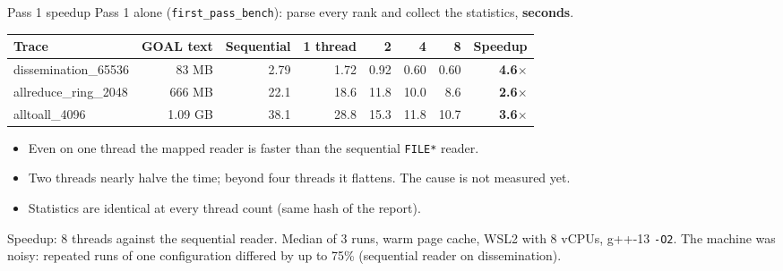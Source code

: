\documentclass[aspectratio=169,11pt]{beamer}
\begin{document}
\begin{frame}{Pass 1 speedup}
\small
Pass 1 alone (\texttt{first\_pass\_bench}): parse every rank and collect the statistics, \textbf{seconds}.
\vspace{2mm}

\centering
\footnotesize
\begin{tabular}{lrrrrrrr}
\toprule
\textbf{Trace} & \textbf{GOAL text} & \textbf{Sequential} & \textbf{1 thread} & \textbf{2} & \textbf{4} & \textbf{8} & \textbf{Speedup} \\
\midrule
dissemination\_65536 & 83 MB & 2.79 & 1.72 & 0.92 & 0.60 & 0.60 & \textbf{4.6$\times$} \\
allreduce\_ring\_2048 & 666 MB & 22.1 & 18.6 & 11.8 & 10.0 & 8.6 & \textbf{2.6$\times$} \\
alltoall\_4096 & 1.09 GB & 38.1 & 28.8 & 15.3 & 11.8 & 10.7 & \textbf{3.6$\times$} \\
\bottomrule
\end{tabular}
\par\raggedright\vspace{3mm}
\small
\begin{itemize}
\item Even on one thread the mapped reader is faster than the sequential \texttt{FILE*} reader.
\item Two threads nearly halve the time; beyond four threads it flattens. The cause is not measured yet.
\item Statistics are identical at every thread count (same hash of the report).
\end{itemize}
{\scriptsize\color{black!60}\par
Speedup: 8 threads against the sequential reader. Median of 3 runs, warm page cache, WSL2 with 8 vCPUs, g++-13 \texttt{-O2}. The machine was noisy: repeated runs of one configuration differed by up to 75\% (sequential reader on dissemination).}
\end{frame}
\end{document}
